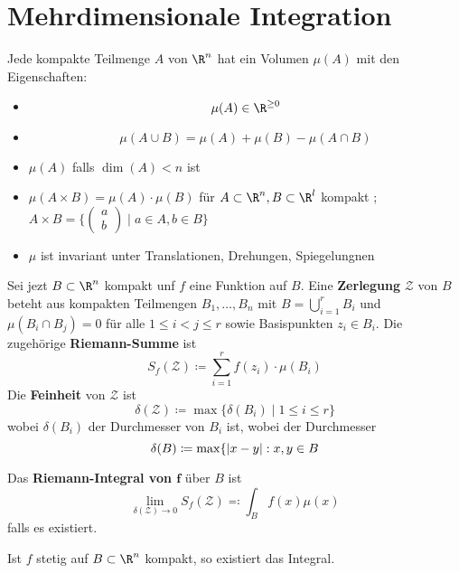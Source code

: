 \chapter{Mehrdimensionale Integration}
\begin{fakt}
	Jede kompakte Teilmenge $A$ von $\R^n$ hat ein Volumen $\mu(A)$ mit den Eigenschaften:
	\begin{itemize}
		\item \[ \mu(A) \in \R^{\geq 0} \]
		\item \[ \mu(A \cup B) = \mu(A) + \mu(B) - \mu(A \cap B) \]
		\item $\mu (A)$ falls $\dim(A) < n$ ist
		\item $\mu(A \times B) = \mu(A) \cdot \mu(B)$ für $A \subset \R^n , B \subset \R^l$ kompakt ; $A \times B = \{ \begin{pmatrix} a \\ b \end{pmatrix} \mid a \in A , b \in B \}$
		\item $\mu$ ist invariant unter Translationen, Drehungen, Spiegelungnen
	\end{itemize}
\end{fakt}

Sei jezt $B \subset \R^n$ kompakt unf $f$ eine Funktion auf $B$. Eine \textbf{Zerlegung} $\mathcal{Z}$ von $B$ beteht aus kompakten Teilmengen $B_1 , \dotsc , B_n$ mit $B = \bigcup_{i=1}^r B_i$ und $\mu(B_i \cap B_j) = 0$ für alle $1 \leq i < j \leq r$ sowie Basispunkten $z_i \in B_i$. Die zugehörige \textbf{Riemann-Summe} ist
\[ S_f(\mathcal{Z}) \coloneqq \sum_{i=1}^r f(z_i) \cdot \mu(B_i) \]
Die \textbf{Feinheit} von $\mathcal{Z}$ ist
\[ \delta(\mathcal{Z}) \coloneqq \max\{ \delta(B_i) \mid 1 \leq i \leq r \} \]
wobei $\delta(B_i)$ der Durchmesser von $B_i$ ist, wobei der Durchmesser
\[ \delta(B) \coloneqq \max\{ \abs{x-y} : x , y \in B \]
\begin{def*}[note = Riemann-Integral , index = Riemann Integral , indexformat = {2!1-~ 1!~-2}]
	Das \textbf{Riemann-Integral von $\mathbf{f}$} über $B$ ist
	\[ \lim_{\delta(\mathcal{Z}) \rightarrow 0} S_f(\mathcal{Z}) \eqqcolon \int_B f(x) \mu(x) \]
	falls es existiert.
\end{def*}
\begin{satz*}
	Ist $f$ stetig auf $B \subset \R^n$ kompakt, so existiert das Integral.
\end{satz*}

